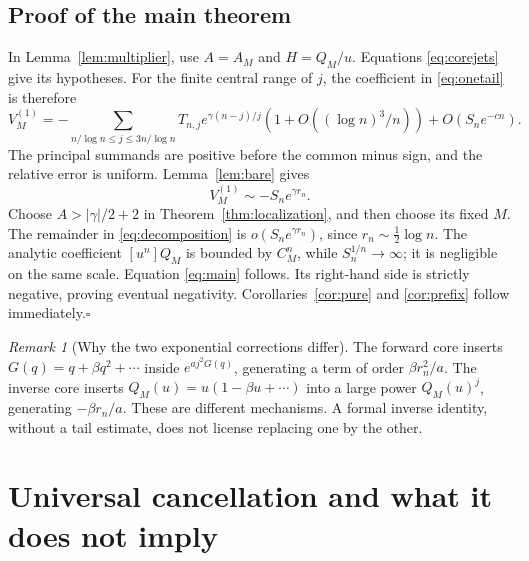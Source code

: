 \documentclass[11pt,a4paper]{article}
\numberwithin{equation}{section}
\theoremstyle{definition}\newtheorem{definition}[theorem]{Definition}
\theoremstyle{remark}\newtheorem{remark}[theorem]{Remark}
\theoremstyle{definition}
\begin{document}
\subsection{Proof of the main theorem}
In Lemma~\ref{lem:multiplier}, use
\(A=A_M\) and \(H=Q_M/u\). Equations \eqref{eq:corejets} give its hypotheses.
For the finite central range of \(j\), the coefficient in \eqref{eq:onetail}
is therefore
\begin{equation}
 [u^n]V_M^{(1)}
 =-\sum_{n/\log n\le j\le3n/\log n}
 T_{n,j}e^{\gamma(n-j)/j}
       (1+O((\log n)^3/n))+O(S_ne^{-cn}).
 \label{eq:onetailasymp}
\end{equation}
The principal summands are positive before the common minus sign, and the
relative error is uniform. Lemma~\ref{lem:bare} gives
\begin{equation}
 [u^n]V_M^{(1)}\sim-S_ne^{\gamma r_n}.
 \label{eq:onetailresult}
\end{equation}
Choose \(A>|\gamma|/2+2\) in Theorem~\ref{thm:localization}, and then choose
its fixed \(M\). The remainder in \eqref{eq:decomposition} is
\(o(S_ne^{\gamma r_n})\), since \(r_n\sim\tfrac12\log n\).
The analytic coefficient \([u^n]Q_M\) is bounded by \(C_M^n\), while
\(S_n^{1/n}\to\infty\); it is negligible on the same scale.
Equation \eqref{eq:main} follows. Its right-hand side is strictly negative,
proving eventual negativity. Corollaries~\ref{cor:pure} and
\ref{cor:prefix} follow immediately.\hfill\(\square\)

\begin{remark}[Why the two exponential corrections differ]
The forward core inserts \(G(q)=q+\beta q^2+\cdots\) inside
\(e^{aj^2G(q)}\), generating a term of order \(\beta r_n^2/a\).
The inverse core inserts \(Q_M(u)=u(1-\beta u+\cdots)\) into a large
power \(Q_M(u)^j\), generating \(-\beta r_n/a\).
These are different mechanisms. A formal inverse identity, without a tail
estimate, does not license replacing one by the other.
\end{remark}

\section{Universal cancellation and what it does not imply}
\label{sec:cancellation}
\end{document}
